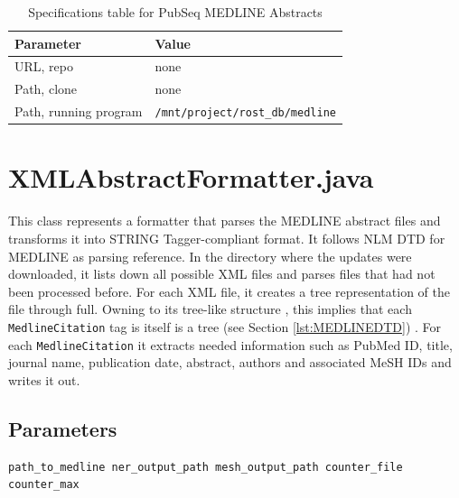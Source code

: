\begin{table}[htbp]
\caption{Specifications table for PubSeq MEDLINE Abstracts}
\centering
\begin{tabular}{ | l | l | }
  \hline
  Parameter & Value \\
  \hline
  URL, repo & none \\
  Path, clone & none \\
  Path, running program & \texttt{/mnt/project/rost\_db/medline}\\
  \hline
\end{tabular}
\end{table}



\section{XMLAbstractFormatter.java}

\label{sec:XMLAbstractFormatter}

This class represents a formatter that parses the MEDLINE abstract files and transforms it into STRING Tagger-compliant format. It follows NLM DTD for MEDLINE \citep{MEDLINEDTD} as parsing reference. In the directory where the updates were downloaded, it lists down all possible XML files and parses files that had not been processed before. For each XML file, it creates a tree representation of the file through full. Owning to its tree-like structure \citep{bray2011extensible} \citep{MEDLINEDTD}, this implies that each \texttt{MedlineCitation} tag is itself is a tree (see Section \ref{lst:MEDLINEDTD}) . For each \texttt{MedlineCitation} it extracts needed information such as PubMed ID, title, journal name, publication date, abstract, authors and associated MeSH IDs \citep{lowe1994understanding} and writes it out.

\subsection{Parameters}

\begin{lstlisting}[breaklines]
path_to_medline ner_output_path mesh_output_path counter_file counter_max
\end{lstlisting}

